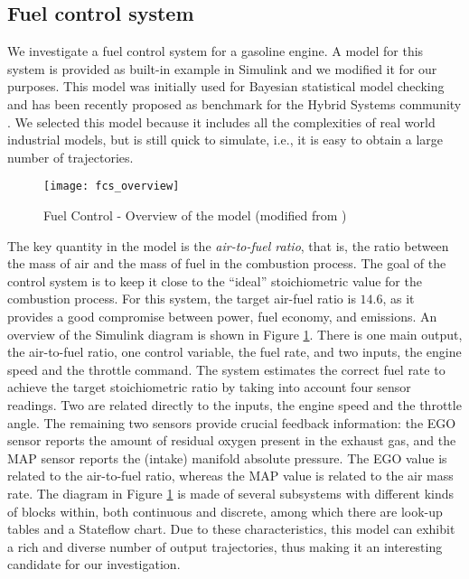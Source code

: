 \subsection{Fuel control system}
We investigate a fuel control system for a gasoline engine. A model for this system is provided as built-in example in Simulink \cite{SimulinkGuideFTFCS} and we modified it for our purposes.
This model was initially used for Bayesian statistical model checking \cite{zuliani_bayesian_2013} and has been recently proposed as benchmark for the Hybrid Systems community \cite{hoxha_benchmarks_2014}.
We selected this model because it includes all the complexities of real world industrial models, but is still quick to simulate, i.e., it is easy to obtain a large number of trajectories.

\begin{figure}
  \centering
  \texttt{[image: fcs\_overview]}
  \caption{Fuel Control - Overview of the model (modified from \cite{SimulinkGuideFTFCS})}\label{fig:fcs_overview}
\end{figure}
The key quantity in the model is the \emph{air-to-fuel ratio}, that is, the ratio between the mass of air and the mass of fuel in the combustion process. The goal of the control system is to keep it close to the ``ideal'' stoichiometric value for the combustion process.
For this system, the target air-fuel ratio is $14.6$, as it provides a good compromise between power, fuel economy, and emissions. An overview of the Simulink diagram is shown in Figure \ref{fig:fcs_overview}.
There is one main output, the air-to-fuel ratio, one control variable, the fuel rate, and two inputs, the engine speed and the throttle command.
The system estimates the correct fuel rate to achieve the target stoichiometric ratio by taking into account four sensor readings.
Two are related directly to the inputs, the engine speed and the throttle angle. The remaining two sensors provide crucial feedback information: the EGO sensor reports the amount of residual oxygen present in the exhaust gas, and the MAP sensor reports the (intake) manifold absolute pressure.
The EGO value is related to the air-to-fuel ratio, whereas the MAP value is related to the air mass rate.
The diagram in Figure \ref{fig:fcs_overview} is made of several subsystems with different kinds of blocks within, both continuous and discrete, among which there are look-up tables and a Stateflow chart.
Due to these characteristics, this model can exhibit a rich and diverse number of output trajectories, thus making it an interesting candidate for our investigation.

